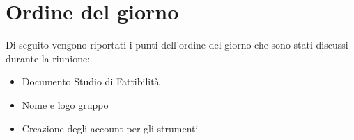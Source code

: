 \clearpage
\section{Ordine del giorno}
Di seguito vengono riportati i punti dell’ordine del giorno che sono stati discussi durante la riunione:
\begin{itemize}
	\item Documento Studio di Fattibilità
	\item Nome e logo gruppo
	\item Creazione degli account per gli strumenti
\end{itemize}
